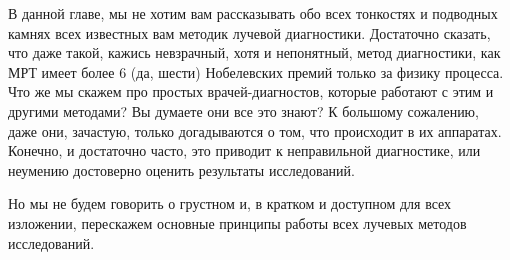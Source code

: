 В данной главе, мы не хотим вам рассказывать обо всех тонкостях и подводных камнях всех известных вам методик лучевой диагностики. Достаточно сказать, что даже такой, кажись невзрачный, хотя и непонятный, метод диагностики, как МРТ имеет более 6 (да, шести) Нобелевских премий только за физику процесса. Что же мы скажем про простых врачей-диагностов, которые работают с этим и другими методами? Вы думаете они все это знают? К большому сожалению, даже они, зачастую, только догадываются о том,  что происходит в их аппаратах. Конечно, и достаточно часто, это приводит к неправильной диагностике, или неумению достоверно оценить результаты исследований.

Но мы не будем говорить о грустном и, в кратком и доступном для всех изложении, перескажем основные принципы работы всех лучевых методов исследований.